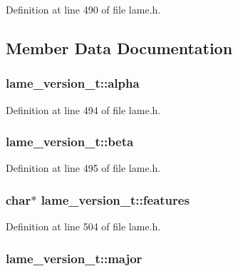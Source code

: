 Definition at line 490 of file lame.\+h.



\subsection{Member Data Documentation}
\subsubsection[{\texorpdfstring{alpha}{alpha}}]{ lame\+\_\+version\+\_\+t\+::alpha}\hypertarget{structlame__version__t_a4e0d47265d25e4e09c25391846e92273}{}\label{structlame__version__t_a4e0d47265d25e4e09c25391846e92273}


Definition at line 494 of file lame.\+h.

\subsubsection[{\texorpdfstring{beta}{beta}}]{ lame\+\_\+version\+\_\+t\+::beta}\hypertarget{structlame__version__t_a92b4b9a68a98a38c547f93748493f11c}{}\label{structlame__version__t_a92b4b9a68a98a38c547f93748493f11c}


Definition at line 495 of file lame.\+h.

\subsubsection[{\texorpdfstring{features}{features}}]{ char$\ast$ lame\+\_\+version\+\_\+t\+::features}\hypertarget{structlame__version__t_acc3db38c169739ddb467c0388b7ff699}{}\label{structlame__version__t_acc3db38c169739ddb467c0388b7ff699}


Definition at line 504 of file lame.\+h.

\subsubsection[{\texorpdfstring{major}{major}}]{ lame\+\_\+version\+\_\+t\+::major}\hypertarget{structlame__version__t_aba32f4dbb0c119bfb2365c427f9fa554}{}\label{structlame__version__t_aba32f4dbb0c119bfb2365c427f9fa554}


